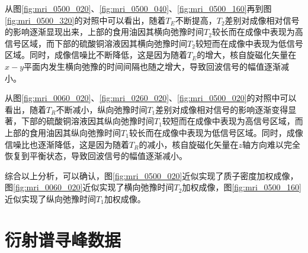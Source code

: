 \documentclass{thuemp}
\begin{document}
从图\ref{fig:mri_0500_020}、\ref{fig:mri_0500_040}、\ref{fig:mri_0500_160}再到图\ref{fig:mri_0500_320}的对照中可以看出，随着$T_E$不断提高，$T_2$差别对成像相对信号的影响逐渐显现出来，上部的食用油因其横向弛豫时间$T_2$较长而在成像中表现为高信号区域，而下部的硫酸铜溶液因其横向弛豫时间$T_2$较短而在成像中表现为低信号区域。同时，成像信噪比不断降低，这是因为随着$T_E$的增大，核自旋磁化矢量在$x-y$平面内发生横向弛豫的时间间隔也随之增大，导致回波信号的幅值逐渐减小。

从图\ref{fig:mri_0060_020}、\ref{fig:mri_0260_020}、\ref{fig:mri_0500_020}的对照中可以看出，随着$T_R$不断减小，纵向弛豫时间$T_1$差别对成像相对信号的影响逐渐变得显著，下部的硫酸铜溶液因其纵向弛豫时间$T_1$较短而在成像中表现为高信号区域，而上部的食用油因其纵向弛豫时间$T_1$较长而在成像中表现为低信号区域。同时，成像信噪比也逐渐降低，这是因为随着$T_R$的减小，核自旋磁化矢量在$z$轴方向难以完全恢复到平衡状态，导致回波信号的幅值逐渐减小。

综合以上分析，可以确认，图\ref{fig:mri_0500_020}近似实现了质子密度加权成像，图\ref{fig:mri_0060_020}近似实现了横向弛豫时间$T_2$加权成像，图\ref{fig:mri_0500_160}近似实现了纵向弛豫时间$T_1$加权成像。




\renewcommand\refname{\heiti\wuhao\centerline{参考文献}\global\def\refname{参考文献}}
\vskip 12pt


\let\OLDthebibliography\thebibliography
\renewcommand\thebibliography[1]{
  \OLDthebibliography{#1}
  \setlength{\parskip}{0pt}
  \setlength{\itemsep}{0pt plus 0.3ex}
}

{
\renewcommand{\baselinestretch}{0.9}
\liuhao


}

\appendix
\section{衍射谱寻峰数据}
\end{document}
